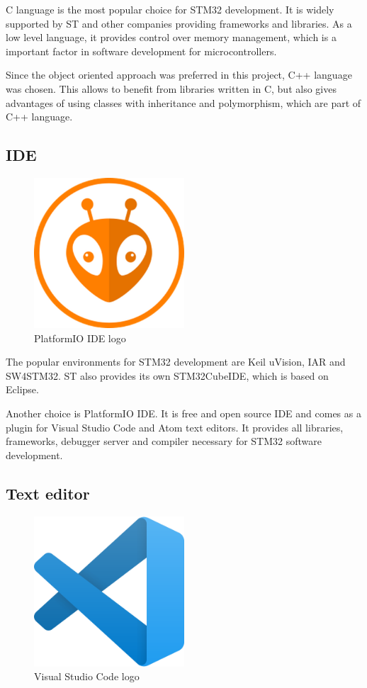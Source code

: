\documentclass[a4paper,twoside,12pt]{book}
\begin{document}
C language is the most popular choice for STM32 development.
It is widely supported by ST and other companies providing frameworks and libraries.
As a low level language, it provides control over memory management,
which is a important factor in software development for microcontrollers.

Since the object oriented approach was preferred in this project,
C++ language was chosen.
This allows to benefit from libraries written in C,
but also gives advantages of using classes with inheritance and polymorphism,
which are part of C++ language.

\subsection{IDE}

\begin{figure}[H]
    \centering
    \includegraphics[width=0.5\textwidth]{images/platformio-logo}
    \caption{PlatformIO IDE logo}
    \label{fig:plaftormio}
\end{figure}

The popular environments for STM32 development are Keil uVision, IAR and SW4STM32.
ST also provides its own STM32CubeIDE, which is based on Eclipse.

Another choice is PlatformIO IDE.
It is free and open source IDE and
comes as a plugin for Visual Studio Code and Atom text editors.
It provides all libraries, frameworks,
debugger server and compiler necessary for STM32 software development.

\subsection{Text editor}
\begin{figure}[H]
    \centering
    \includegraphics[width=0.5\textwidth]{images/vscode}
    \caption{Visual Studio Code logo}
    \label{fig:vscode}
\end{figure}
\end{document}
